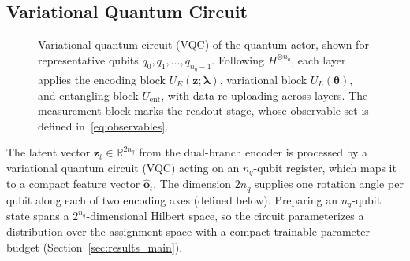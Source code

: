 \documentclass[12pt,onecolumn]{IEEEtran}
\newif\iffull
\begin{document}
\subsection{Variational Quantum Circuit}
\label{sec:vqc}
\begin{figure}[t]
\centering
{}
\caption{Variational quantum circuit (VQC) of the quantum actor, shown for
representative qubits $q_0,q_1,\ldots,q_{n_q-1}$.
Following $H^{\otimes n_q}$, each layer applies the encoding block
$U_E(\mathbf{z};\boldsymbol{\lambda})$, variational block $U_L(\boldsymbol{\theta})$,
and entangling block $U_{\mathrm{ent}}$, with data re-uploading across layers.
The measurement block marks the readout stage, whose observable set is defined
in~\eqref{eq:observables}.}
\label{fig:vqc}
\end{figure}
\iffull
The latent vector $\mathbf{z}_t \in \mathbb{R}^{2n_q}$ from the dual-branch encoder is processed by a variational quantum circuit (VQC) acting on an $n_q$-qubit register, which maps it to a compact feature vector $\hat{\mathbf{o}}_t$.
The dimension $2n_q$ supplies one rotation angle per qubit along each of two encoding axes (defined below). 
Preparing an $n_q$-qubit state spans a $2^{n_q}$-dimensional Hilbert space, so the circuit parameterizes a distribution over the assignment space with a compact trainable-parameter budget (Section~\ref{sec:results_main}).
\end{document}

